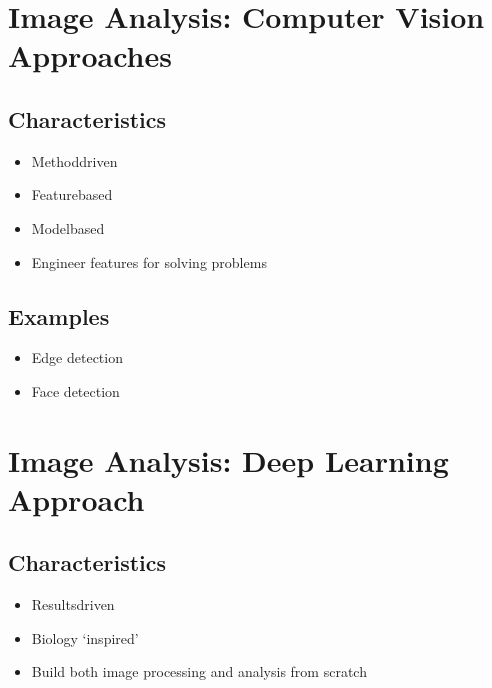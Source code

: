 \documentclass[letterpaper,10pt,english]{sphinxmanual}
\begin{document}
\section{Image Analysis: Computer Vision Approaches}
\label{\detokenize{01-Introduction:image-analysis-computer-vision-approaches}}



\subsection{Characteristics}
\label{\detokenize{01-Introduction:id1}}\begin{itemize}
\item {} 
\sphinxAtStartPar
Method\sphinxhyphen{}driven

\item {} 
\sphinxAtStartPar
Feature\sphinxhyphen{}based

\item {} 
\sphinxAtStartPar
{} Model\sphinxhyphen{}based

\item {} 
\sphinxAtStartPar
Engineer features for solving problems

\end{itemize}


\subsection{Examples}
\label{\detokenize{01-Introduction:id2}}\begin{itemize}
\item {} 
\sphinxAtStartPar
Edge detection

\item {} 
\sphinxAtStartPar
Face detection

\end{itemize}




\section{Image Analysis: Deep Learning Approach}
\label{\detokenize{01-Introduction:image-analysis-deep-learning-approach}}



\subsection{Characteristics}
\label{\detokenize{01-Introduction:id3}}\begin{itemize}
\item {} 
\sphinxAtStartPar
Results\sphinxhyphen{}driven

\item {} 
\sphinxAtStartPar
Biology ‘inspired’

\item {} 
\sphinxAtStartPar
Build both image processing and analysis from scratch

\end{itemize}
\end{document}

